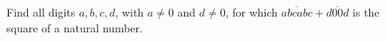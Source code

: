 Find all digits $a,b,c,d$, with $a\ne0$ and $d\ne0$, for which $\overline{abcabc}+\overline{d00d}$ is the square of a natural number.
